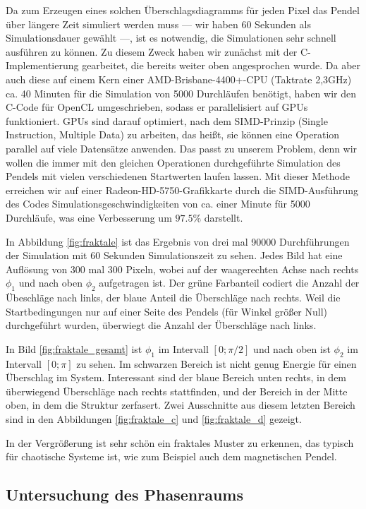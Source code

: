 Da zum Erzeugen eines solchen Überschlagsdiagramms für jeden Pixel das Pendel über längere Zeit simuliert werden muss --- wir haben 60 Sekunden
als Simulationsdauer gewählt ---, ist es notwendig, die Simulationen sehr schnell ausführen zu können. Zu diesem Zweck haben wir zunächst mit der
C-Implementierung gearbeitet, die bereits weiter oben angesprochen wurde. Da aber auch diese auf einem Kern einer AMD-Brisbane-4400+-CPU
(Taktrate 2,3GHz) ca. 40 Minuten für die Simulation von 5000 Durchläufen benötigt, haben wir den C-Code für OpenCL umgeschrieben, sodass er
parallelisiert auf GPUs funktioniert. GPUs sind darauf optimiert, nach dem SIMD-Prinzip (Single Instruction, Multiple Data) zu arbeiten, das heißt, sie
können eine Operation parallel auf viele Datensätze anwenden. Das passt zu unserem Problem, denn wir wollen die immer mit den gleichen
Operationen durchgeführte Simulation des Pendels mit vielen verschiedenen Startwerten laufen lassen. Mit dieser Methode erreichen wir auf einer
Radeon-HD-5750-Grafikkarte durch die SIMD-Ausführung des Codes Simulationsgeschwindigkeiten von ca. einer Minute für 5000 Durchläufe, was eine
Verbesserung um $97.5\%$ darstellt.

In Abbildung \ref{fig:fraktale} ist das Ergebnis von drei mal 90000 Durchführungen der Simulation mit 60 Sekunden Simulationszeit zu sehen.
Jedes Bild hat eine Auflösung von 300 mal 300 Pixeln, wobei auf der waagerechten Achse nach rechts $\phi_1$ und nach oben $\phi_2$ aufgetragen ist.
Der grüne Farbanteil codiert die Anzahl der Übeschläge nach links, der blaue Anteil die Überschläge nach rechts.
Weil die Startbedingungen nur auf einer Seite des Pendels (für Winkel größer Null) durchgeführt wurden, überwiegt die Anzahl der Überschläge nach links.

In Bild \ref{fig:fraktale_gesamt} ist $\phi_1$ im Intervall $[0; \pi/2]$ und nach oben ist $\phi_2$ im Intervall $[0; \pi]$ zu sehen.
Im schwarzen Bereich ist nicht genug Energie für einen Überschlag im System.
Interessant sind der blaue Bereich unten rechts, in dem überwiegend Überschläge nach rechts stattfinden, und der Bereich in der Mitte oben, in dem die Struktur zerfasert.
Zwei Ausschnitte aus diesem letzten Bereich sind in den Abbildungen \ref{fig:fraktale_c} und \ref{fig:fraktale_d} gezeigt.

In der Vergrößerung ist sehr schön ein fraktales Muster zu erkennen, das typisch für chaotische Systeme ist, wie zum Beispiel auch dem magnetischen Pendel. \citep{wikimagnetisch}

\subsection{Untersuchung des Phasenraums}

